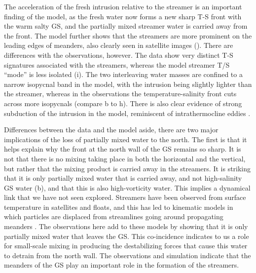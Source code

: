 \documentclass{natureJMK}
\begin{document}
The acceleration of the fresh intrusion relative to the streamer is an important finding of the model, as the fresh water now forms a new sharp T-S front with the warm salty GS, and the partially mixed streamer water is carried away from the front.  The model further shows that the streamers are more prominent on the leading edges of meanders, also clearly seen in satellite images ().  There are differences with the observations, however.  The data show very distinct T-S signatures associated with the streamers, whereas the model streamer T/S ``mode'' is less isolated (i).  The two interleaving water masses are   confined to a narrow isopycnal band in the model, with the intrusion being slightly lighter than the streamer, whereas in the observations the temperature-salinity front cuts across more isopycnals (compare b to h).   There is also clear evidence of strong subduction of the intrusion in the model, reminiscent of intrathermocline eddies \cite{thomasjoyce10}.    

Differences between the data and the model aside, there are two major implications of the loss of partially mixed water to the north.  The first is that it helps explain why the front at the north wall of the GS remains so sharp.  It is not that there is no mixing taking place in both the horizontal and the vertical, but rather that the mixing product is carried away in the streamers.  It is striking that it is only partially mixed water that is carried away, and not high-salinity GS water (b), and that this is also high-vorticity water.  This implies a dynamical link that we have not seen explored.  Streamers have been observed from surface temperature in satellites and floats\cite{bowerrossby89,flierletal87,lozieretal97,songetal95}, and this has led to kinematic models in which particles are displaced from streamlines going around propagating meanders \cite{bower91,prattetal95,lozieretal97}. The observations here add to these models by showing that it is only partially mixed water that leaves the GS.  This co-incidence indicates to us a role for small-scale mixing in producing the destabilizing forces that cause this water to detrain from the north wall.  The observations and simulation indicate that the meanders of the GS play an important role in the formation of the streamers.
\end{document}
